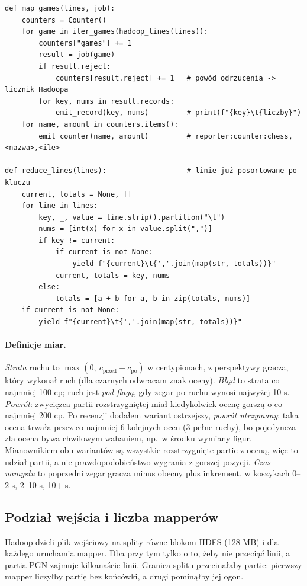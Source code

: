 \documentclass[11pt,a4paper]{article}
\begin{document}
\begin{lstlisting}[style=pyc,caption={Rdzeń mappera i reducera, wersja uproszczona (pełny kod: src/streaming.py).}]
def map_games(lines, job):
    counters = Counter()
    for game in iter_games(hadoop_lines(lines)):
        counters["games"] += 1
        result = job(game)
        if result.reject:
            counters[result.reject] += 1   # powód odrzucenia -> licznik Hadoopa
        for key, nums in result.records:
            emit_record(key, nums)         # print(f"{key}\t{liczby}")
    for name, amount in counters.items():
        emit_counter(name, amount)         # reporter:counter:chess,<nazwa>,<ile>

def reduce_lines(lines):                   # linie już posortowane po kluczu
    current, totals = None, []
    for line in lines:
        key, _, value = line.strip().partition("\t")
        nums = [int(x) for x in value.split(",")]
        if key != current:
            if current is not None:
                yield f"{current}\t{','.join(map(str, totals))}"
            current, totals = key, nums
        else:
            totals = [a + b for a, b in zip(totals, nums)]
    if current is not None:
        yield f"{current}\t{','.join(map(str, totals))}"
\end{lstlisting}

\paragraph{Definicje miar.}
\emph{Strata} ruchu to $\max(0,\ c_\text{przed}-c_\text{po})$ w centypionach, z perspektywy gracza, który wykonał ruch (dla czarnych odwracam znak oceny). \emph{Błąd} to strata co najmniej 100 cp; ruch jest \emph{pod flagą}, gdy zegar po ruchu wynosi najwyżej 10 s. \emph{Powrót}: zwycięzca partii rozstrzygniętej miał kiedykolwiek ocenę gorszą o co najmniej 200 cp. Po recenzji dodałem wariant ostrzejszy, \emph{powrót utrzymany}: taka ocena trwała przez co najmniej 6 kolejnych ocen (3 pełne ruchy), bo pojedyncza zła ocena bywa chwilowym wahaniem, np.\ w środku wymiany figur. Mianownikiem obu wariantów są wszystkie rozstrzygnięte partie z oceną, więc to udział partii, a nie prawdopodobieństwo wygrania z gorszej pozycji. \emph{Czas namysłu} to poprzedni zegar gracza minus obecny plus inkrement, w koszykach 0--2 s, 2--10 s, 10+ s.

\subsection{Podział wejścia i liczba mapperów}
Hadoop dzieli plik wejściowy na splity równe blokom HDFS (128 MB) i dla każdego uruchamia mapper. Dba przy tym tylko o to, żeby nie przeciąć linii, a partia PGN zajmuje kilkanaście linii. Granica splitu przecinałaby partie: pierwszy mapper liczyłby partię bez końcówki, a drugi pominąłby jej ogon.
\end{document}
